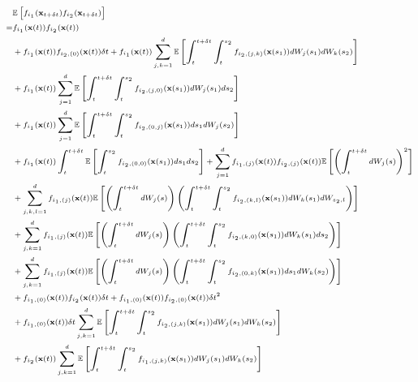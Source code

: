 \begin{equation} \label{eq:E12}
\scriptsize
\begin{aligned}
&\mathbb{E} \left[ f_{i_1}(\mathbf{x}_{t + \delta t}) f_{i_2}(\mathbf{x}_{t + \delta t}) \right] \\
=&
f_{i_1}(\mathbf{x}(t)) f_{i_2}(\mathbf{x}(t)) \\
&+  f_{i_1}(\mathbf{x}(t)) f_{{i_2},(0)}(\mathbf{x}(t)) \delta t
+ f_{i_1}(\mathbf{x}(t)) \sum_{j, k=1}^\lowdim \mathbb{E} \left[ \int_t^{t+\delta t} \int_t^{s_2} f_{{i_2}, (j,k)}(\mathbf{x}(s_1)) dW_j(s_1) dW_k(s_2) \right] \\
&+ f_{i_1}(\mathbf{x}(t)) \sum_{j=1}^\lowdim \mathbb{E}  \left[ \int_t^{t+\delta t} \int_t^{s_2} f_{{i_2}, (j,0)}(\mathbf{x}(s_1)) dW_j(s_1) ds_2 \right] \\
& + f_{i_1}(\mathbf{x}(t)) \sum_{j=1}^\lowdim \mathbb{E} \left[ \int_t^{t+\delta t} \int_t^{s_2} f_{{i_2}, (0,j)}(\mathbf{x}(s_1)) ds_1 dW_j(s_2) \right] \\
&+ f_{i_1}(\mathbf{x}(t)) \int_t^{t+\delta t} \mathbb{E} \left[ \int_t^{s_2} f_{{i_2}, (0,0)}(\mathbf{x}(s_1)) ds_1 ds_2 \right]
+  \sum_{j=1}^\lowdim f_{{i_1},(j)}(\mathbf{x}(t)) f_{{i_2},(j)}(\mathbf{x}(t)) \mathbb{E} \left[ \left( \int_t^{t + \delta t} dW_j(s) \right)^2 \right] \\
&+ \sum_{j,k,l=1}^\lowdim f_{{i_1},(j)}(\mathbf{x}(t)) \mathbb{E} \left[ \left( \int_t^{t + \delta t} dW_j(s) \right) \left( \int_t^{t+\delta t} \int_t^{s_2} f_{{i_2},(k,l)}(\mathbf{x}(s_1)) dW_k(s_1) dW_{s_2, l} \right) \right] \\
&+ \sum_{j,k=1}^\lowdim f_{{i_1},(j)}(\mathbf{x}(t)) \mathbb{E} \left[ \left( \int_t^{t + \delta t} dW_j(s) \right)\left( \int_t^{t+\delta t} \int_t^{s_2} f_{{i_2},(k,0)}(\mathbf{x}(s_1)) dW_k(s_1) ds_2 \right) \right]\\
&+ \sum_{j, k=1}^\lowdim f_{{i_1},(j)}(\mathbf{x}(t)) \mathbb{E} \left[ \left( \int_t^{t + \delta t} dW_j(s) \right) \left( \int_t^{t+\delta t} \int_t^{s_2} f_{{i_2},(0,k)}(\mathbf{x}(s_1)) ds_1 dW_k(s_2) \right) \right] \\
&+f_{{i_1},(0)}(\mathbf{x}(t)) f_{i_2}(\mathbf{x}(t)) \delta t
+  f_{{i_1},(0)}(\mathbf{x}(t))f_{{i_2},(0)}(\mathbf{x}(t)) \delta t^2 \\
& +  f_{{i_1},(0)}(\mathbf{x}(t)) \delta t \sum_{j, k=1}^\lowdim \mathbb{E} \left[ \int_t^{t+\delta t} \int_t^{s_2} f_{{i_2},(j,k)}(\mathbf{x}(s_1)) dW_j(s_1) dW_k(s_2) \right] \\
&+f_{i_2}(\mathbf{x}(t)) \sum_{j, k=1}^\lowdim \mathbb{E} \left[ \int_t^{t+\delta t} \int_t^{s_2} f_{{i_1},(j,k)}(\mathbf{x}(s_1)) dW_j(s_1) dW_k(s_2) \right] \\

\end{aligned}
\end{equation}
